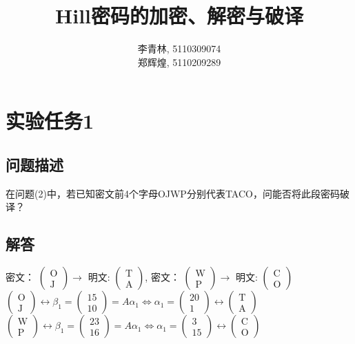 \documentclass[12pt]{article}
\date{}
\title{Hill密码的加密、解密与破译}
\author{李青林, 5110309074\\郑辉煌, 5110209289\\}
\begin{document}
\maketitle
\section*{实验任务1}
\subsection*{问题描述}
在问题(2)中，若已知密文前4个字母OJWP分别代表TACO，问能否将此段密码破译？
\subsection*{解答}
密文：
$\begin{pmatrix}
\text{O}\\ \text{J}
\end{pmatrix}\longrightarrow$
明文:
$\begin{pmatrix}
\text{T}\\ \text{A}
\end{pmatrix}$, 
密文：
$\begin{pmatrix}
\text{W}\\ \text{P}
\end{pmatrix}\longrightarrow$
明文:
$\begin{pmatrix}
\text{C}\\ \text{O}
\end{pmatrix}$\\

$\begin{pmatrix}
\text{O}\\ \text{J}
\end{pmatrix}\leftrightarrow\beta_1=
\begin{pmatrix}
15\\10
\end{pmatrix}=A\alpha_1\Leftrightarrow\alpha_1=
\begin{pmatrix}
20\\1
\end{pmatrix}\leftrightarrow
\begin{pmatrix}
\text{T}\\ \text{A}
\end{pmatrix}
$\\
$\begin{pmatrix}
\text{W}\\ \text{P}
\end{pmatrix}\leftrightarrow\beta_1=
\begin{pmatrix}
23\\16
\end{pmatrix}=A\alpha_1\Leftrightarrow\alpha_1=
\begin{pmatrix}
3\\15
\end{pmatrix}\leftrightarrow
\begin{pmatrix}
\text{C}\\ \text{O}
\end{pmatrix}$\\
\end{document}
